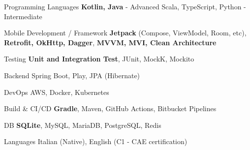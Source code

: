 
\begin{cvskills}
  \cvskill
    {Programming Languages} %
    {\textbf{Kotlin, Java} - Advanced}
  \cvskill
    {} %
    {Scala, TypeScript, Python - Intermediate}
    
  \cvskill
    {Mobile Development / Framework}
    {\textbf{Jetpack} (Compose, ViewModel, Room, etc), \textbf{Retrofit, OkHttp, Dagger},}
  \cvskill
  	{}
  	{\textbf{MVVM, MVI, Clean Architecture}}
    
  \cvskill
    {Testing} %
    {\textbf{Unit and Integration Test}, JUnit, MockK, Mockito} %
    
  \cvskill
    {Backend} %
    {Spring Boot, Play, JPA (Hibernate)} %
    
  \cvskill
    {DevOps} %
    {AWS, Docker, Kubernetes} %

  \cvskill
    {Build \& CI/CD} %
    {\textbf{Gradle}, Maven, GitHub Actions, Bitbucket Pipelines} %

  \cvskill
    {DB} %
    {\textbf{SQLite}, MySQL, MariaDB, PostgreSQL, Redis} %
    
  \cvskill
    {Languages} %
    {Italian (Native), English (C1 - CAE certification)} %

\end{cvskills}
